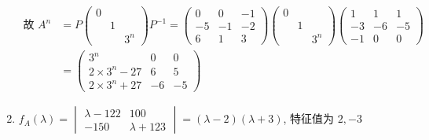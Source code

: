 \begin{enumerate}
			       \(\begin{aligned}
				       \text{故 } A^{n} & = P\begin{pmatrix}
					                            0 &   &       \\
					                              & 1 &       \\
					                              &   & 3^{n}
				                            \end{pmatrix}P^{-1} = \begin{pmatrix}
					                                                  0  & 0  & -1 \\
					                                                  -5 & -1 & -2 \\
					                                                  6  & 1  & 3
				                                                  \end{pmatrix}\begin{pmatrix}
					                                                               0 &   &       \\
					                                                                 & 1 &       \\
					                                                                 &   & 3^{n}
				                                                               \end{pmatrix}\begin{pmatrix}
					                                                                            1  & 1  & 1  \\
					                                                                            -3 & -6 & -5 \\
					                                                                            -1 & 0  & 0
				                                                                            \end{pmatrix} \\
				                       & = \begin{pmatrix}
					                           3^{n}           & 0  & 0  \\
					                           2\times3^{n}-27 & 6  & 5  \\
					                           2\times3^{n}+27 & -6 & -5
				                           \end{pmatrix}
			       \end{aligned} \)
			 \item %
			       \( f_{A}(\lambda) = \begin{vmatrix}
				       \lambda - 122 & 100           \\
				       -150          & \lambda + 123
			       \end{vmatrix} = (\lambda - 2)(\lambda + 3) \), 特征值为 \( 2, -3 \)


\end{enumerate}
